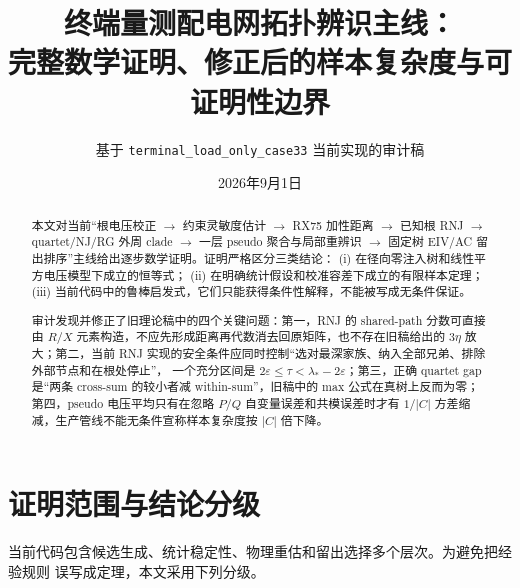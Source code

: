 \documentclass[UTF8,11pt]{ctexart}
\title{终端量测配电网拓扑辨识主线：\\完整数学证明、修正后的样本复杂度与可证明性边界}
\author{基于 \texttt{terminal\_load\_only\_case33} 当前实现的审计稿}
\date{2026年9月1日}
\begin{document}
\maketitle
\tableofcontents

\begin{abstract}
本文对当前“根电压校正 $\to$ 约束灵敏度估计 $\to$ RX75 加性距离 $\to$
已知根 RNJ $\to$ quartet/NJ/RG 外周 clade $\to$ 一层 pseudo 聚合与局部重辨识
$\to$ 固定树 EIV/AC 留出排序”主线给出逐步数学证明。证明严格区分三类结论：
(i) 在径向零注入树和线性平方电压模型下成立的恒等式；
(ii) 在明确统计假设和校准容差下成立的有限样本定理；
(iii) 当前代码中的鲁棒启发式，它们只能获得条件性解释，不能被写成无条件保证。

审计发现并修正了旧理论稿中的四个关键问题：第一，RNJ 的 shared-path 分数可直接由
$R/X$ 元素构造，不应先形成距离再代数消去回原矩阵，也不存在旧稿给出的 $3\eta$ 放大；第二，当前 RNJ
实现的安全条件应同时控制“选对最深家族、纳入全部兄弟、排除外部节点和在根处停止”，
一个充分区间是 $2\varepsilon\le\tau<\lambda_*-2\varepsilon$；第三，正确 quartet
gap 是“两条 cross-sum 的较小者减 within-sum”，旧稿中的 max 公式在真树上反而为零；
第四，pseudo 电压平均只有在忽略 $P/Q$ 自变量误差和共模误差时才有
$1/|C|$ 方差缩减，生产管线不能无条件宣称样本复杂度按 $|C|$ 倍下降。
\end{abstract}

\section{证明范围与结论分级}

当前代码包含候选生成、统计稳定性、物理重估和留出选择多个层次。为避免把经验规则
误写成定理，本文采用下列分级。
\end{document}
